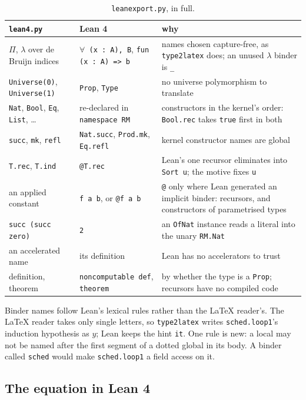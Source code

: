 \documentclass[11pt]{article}
\newcommand{\code}[1]{\texttt{#1}}
\begin{document}
\begin{table}[h]
\centering
\tiny
\begin{tabular}{p{4.3cm}p{4.3cm}p{6.4cm}}
\toprule
\code{lean4.py} & Lean 4 & why \\
\midrule
$\Pi$, $\lambda$ over de Bruijn indices & \code{$\forall$ (x : A), B}, \code{fun (x : A) => b} & names chosen capture-free, as \code{type2latex} does; an unused $\lambda$ binder is \code{\_} \\
\code{Universe(0)}, \code{Universe(1)} & \code{Prop}, \code{Type} & no universe polymorphism to translate \\
\code{Nat}, \code{Bool}, \code{Eq}, \code{List}, \ldots & re-declared in \code{namespace RM} & constructors in the kernel's order: \code{Bool.rec} takes \code{true} first in both \\
\code{succ}, \code{mk}, \code{refl} & \code{Nat.succ}, \code{Prod.mk}, \code{Eq.refl} & kernel constructor names are global \\
\code{T.rec}, \code{T.ind} & \code{@T.rec} & Lean's one recursor eliminates into \code{Sort u}; the motive fixes \code{u} \\
an applied constant & \code{f a b}, or \code{@f a b} & \code{@} only where Lean generated an implicit binder: recursors, and constructors of parametrised types \\
\code{succ (succ zero)} & \code{2} & an \code{OfNat} instance reads a literal into the unary \code{RM.Nat} \\
an accelerated name & its definition & Lean has no accelerators to trust \\
definition, theorem & \code{noncomputable def}, \code{theorem} & by whether the type is a \code{Prop}; recursors have no compiled code \\
\bottomrule
\end{tabular}
\caption{\code{leanexport.py}, in full.}
\label{tab:translation}
\end{table}

Binder names follow Lean's lexical rules rather than the \LaTeX{} reader's.
The \LaTeX{} reader takes only single letters, so \code{type2latex} writes
\code{sched.loop1}'s induction hypothesis as $y$; Lean keeps the hint
\code{it}. One rule is new: a local may not be named after the first segment
of a dotted global in its body. A binder called \code{sched} would make
\code{sched.loop1} a field access on it.

\subsection{The equation in Lean 4}
\end{document}
